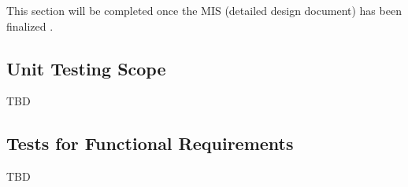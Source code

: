 \documentclass[10pt,titlepage]{article}
\begin{document}
This section will be completed once the MIS (detailed design document) has been finalized \cite{MIS}.




\subsection{Unit Testing Scope}

TBD


\subsection{Tests for Functional Requirements}

TBD


\end{document}
